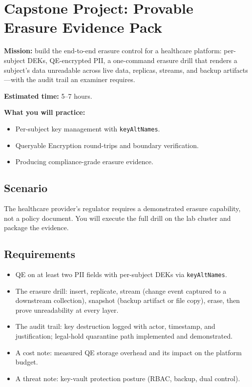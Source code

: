 \section{Capstone Project: Provable Erasure Evidence Pack}\label{sec:ch18-capstone}

\begin{capstonebox}
\textbf{Mission:} build the end-to-end erasure control for a healthcare platform: per-subject DEKs, QE-encrypted PII, a one-command erasure drill that renders a subject's data unreadable across live data, replicas, streams, and backup artifacts---with the audit trail an examiner requires.

\textbf{Estimated time:} 5--7 hours.

\textbf{What you will practice:}
\begin{itemize}
    \item Per-subject key management with \texttt{keyAltNames}.
    \item Queryable Encryption round-trips and boundary verification.
    \item Producing compliance-grade erasure evidence.
\end{itemize}
\end{capstonebox}

\subsection*{Scenario}
The healthcare provider's regulator requires a demonstrated erasure capability, not a policy document. You will execute the full drill on the lab cluster and package the evidence.

\subsection*{Requirements}
\begin{itemize}
    \item QE on at least two PII fields with per-subject DEKs via \texttt{keyAltNames}.
    \item The erasure drill: insert, replicate, stream (change event captured to a downstream collection), snapshot (backup artifact or file copy), erase, then prove unreadability at every layer.
    \item The audit trail: key destruction logged with actor, timestamp, and justification; legal-hold quarantine path implemented and demonstrated.
    \item A cost note: measured QE storage overhead and its impact on the platform budget.
    \item A threat note: key-vault protection posture (RBAC, backup, dual control).
\end{itemize}

